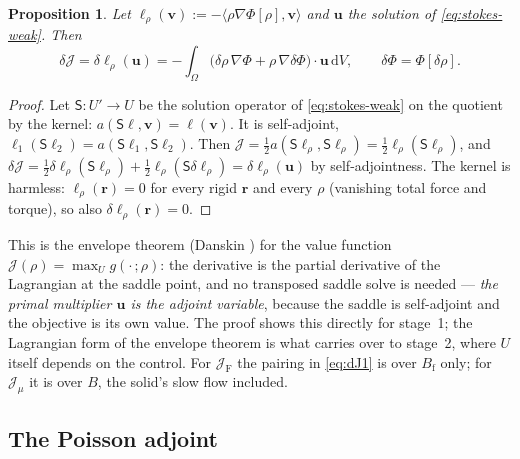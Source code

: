 \documentclass[11pt]{article}
\newtheorem{proposition}{Proposition}
\newcommand{\Jf}{\mathscr{J}}  %
\newcommand{\Bf}{B_{\mathrm{f}}}
\newcommand{\bu}{\mathbf{u}}
\newcommand{\bv}{\mathbf{v}}
\newcommand{\br}{\mathbf{r}}
\newcommand{\dV}{\,\mathrm{d}V}
\newcommand{\ip}[2]{\langle #1, #2\rangle}
\newcommand{\JF}{\Jf _{\mathrm{F}}}
\newcommand{\Jmu}{\Jf _{\mu}}
\begin{document}
\begin{proposition}\label{prop:envelope}
Let $\ell_\rho(\bv) := -\ip{\rho\nabla\Phi[\rho]}{\bv}$ and $\bu$ the
solution of \eqref{eq:stokes-weak}. Then
\begin{equation}
  \delta \Jf  = \delta\ell_\rho(\bu)
  = -\int_\Omega \bigl(\delta\rho\,\nabla\Phi + \rho\,\nabla\delta\Phi\bigr)\cdot\bu\dV ,
  \qquad \delta\Phi = \Phi[\delta\rho] .
  \label{eq:dJ1}
\end{equation}
\end{proposition}
\begin{proof}
Let $\mathsf{S}: U' \to U$ be the solution operator of
\eqref{eq:stokes-weak} on the quotient by the kernel: $a(\mathsf{S}\ell,\bv)
= \ell(\bv)$. It is self-adjoint, $\ell_1(\mathsf{S}\ell_2) =
a(\mathsf{S}\ell_1,\mathsf{S}\ell_2)$. Then $\Jf  = \tfrac12 a(\mathsf{S}\ell_\rho,
\mathsf{S}\ell_\rho) = \tfrac12\ell_\rho(\mathsf{S}\ell_\rho)$, and
$\delta \Jf  = \tfrac12\delta\ell_\rho(\mathsf{S}\ell_\rho) +
\tfrac12\ell_\rho(\mathsf{S}\delta\ell_\rho) = \delta\ell_\rho(\bu)$
by self-adjointness. The kernel is harmless: $\ell_\rho(\br) = 0$ for
every rigid $\br$ and every $\rho$ (vanishing total force and torque),
so also $\delta\ell_\rho(\br) = 0$.
\end{proof}

This is the envelope theorem (Danskin \cite{Danskin}) for the value
function $\Jf (\rho) = \max_{U} g(\cdot\,;\rho)$: the derivative is the
partial derivative of the Lagrangian at the saddle point, and no
transposed saddle solve is needed --- \emph{the primal multiplier $\bu$
is the adjoint variable}, because the saddle is self-adjoint and the
objective is its own value. The proof shows this directly for stage~1;
the Lagrangian form of the envelope theorem is what carries over to
stage~2, where $U$ itself depends on the control. For $\JF$ the pairing
in \eqref{eq:dJ1} is over $\Bf$ only; for $\Jmu$ it is over $B$, the
solid's slow flow included.

\subsection{The Poisson adjoint}
\end{document}
